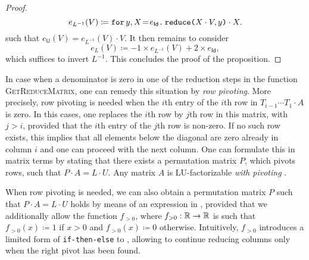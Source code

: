\begin{proof}
    $$
    e_{L^{-1}}(V) \coloneqq    \initf{e_{\mathsf{Id}}}{y}{X}{\red{X\cdot V}{y}\cdot X}.
    $$
    such that	$e_{\mathsf{U}}(V)=  e_{L^{-1}}(V) \cdot V$.
 It then remains to consider
    $$
    e_{L}(V) \coloneqq    -1\times e_{L^{-1}}(V) + 2\times e_{\mathsf{Id}},
    $$
which suffices to invert $L^{-1}$. This concludes the proof of the proposition.    
\end{proof}


In case when  a denominator is zero in one of the reduction steps in the function
\textsc{GetReduceMatrix}, one can remedy this situation by \textit{row pivoting}.  More precisely, row pivoting is needed when the $i$th entry of the
$i$th row in $T_{i-1}\cdots T_1\cdot A$ is zero. In this cases, one replaces the $i$th row by  $j$th row in this matrix, with $j>i$, provided that the $i$th entry of the $j$th row is non-zero. If no such row exists, this implies that all elements below the diagonal are zero already in column $i$ and one can proceed with the next column. One can formulate this in matrix terms by stating that there exists a permutation matrix $P$, which pivots rows, such that $P\cdot A=L\cdot U$. Any matrix $A$ is LU-factorizable \textit{with pivoting} \cite{num}.

When row pivoting is needed, we can also obtain a permutation matrix
$P$ such that $P\cdot A=L\cdot U$ holds by means of an expression in \langfor, provided
that we additionally allow the function $f_{>0}$, 
where $f_{>0}:\RR\to\RR$ is such that $f_{>0}(x)\coloneqq  1$ if $x>0$ and $f_{>0}(x)\coloneqq  0$ otherwise.
Intuitively, $f_{>0}$ introduces a limited form of \texttt{if-then-else} to \langfor, allowing to continue reducing columns only when the right pivot has been found.

